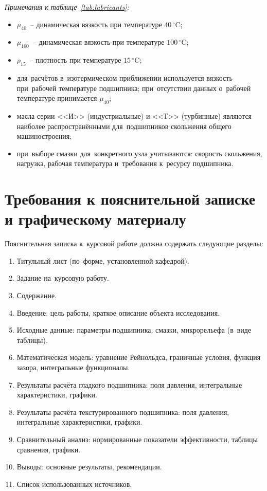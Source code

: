 \FloatBarrier

\textit{Примечания к таблице~\ref{tab:lubricants}:}
\begin{itemize}
\item $\mu_{40}$~-- динамическая вязкость при температуре $40\,^{\circ}$C;
\item $\mu_{100}$~-- динамическая вязкость при температуре $100\,^{\circ}$C;
\item $\rho_{15}$~-- плотность при температуре $15\,^{\circ}$C;
\item для~расчётов в~изотермическом приближении используется вязкость при~рабочей температуре подшипника; при~отсутствии данных о~рабочей температуре принимается $\mu_{40}$;
\item масла серии <<И>> (индустриальные) и <<Т>> (турбинные) являются наиболее распространёнными для~подшипников скольжения общего машиностроения;
\item при~выборе смазки для~конкретного узла учитываются: скорость скольжения, нагрузка, рабочая температура и~требования к~ресурсу подшипника.
\end{itemize}


\section{Требования к пояснительной записке и графическому материалу}\label{sec:requirements}

Пояснительная записка к~курсовой работе должна содержать следующие разделы:

\begin{enumerate}
\item Титульный лист (по~форме, установленной кафедрой).
\item Задание на~курсовую работу.
\item Содержание.
\item Введение: цель работы, краткое описание объекта исследования.
\item Исходные данные: параметры подшипника, смазки, микрорельефа (в~виде таблицы).
\item Математическая модель: уравнение Рейнольдса, граничные условия, функция зазора, интегральные функционалы.
\item Результаты расчёта гладкого подшипника: поля давления, интегральные характеристики, графики.
\item Результаты расчёта текстурированного подшипника: поля давления, интегральные характеристики, графики.
\item Сравнительный анализ: нормированные показатели эффективности, таблицы сравнения, графики.
\item Выводы: основные результаты, рекомендации.
\item Список использованных источников.
\end{enumerate}

